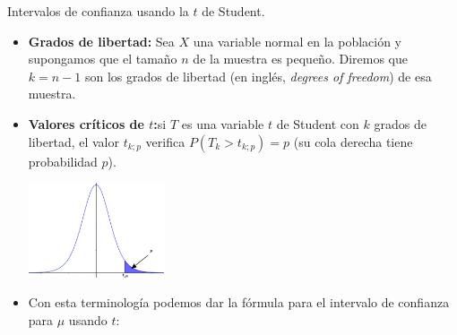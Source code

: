 \documentclass[
  9pt,
  ignorenonframetext,
]{beamer}
\begin{document}
\begin{frame}{Intervalos de confianza usando la \(t\) de Student.}
\protect\hypertarget{intervalos-de-confianza-usando-la-t-de-student.}{}

\begin{itemize}
\item
  \textbf{Grados de libertad:} Sea \(X\) una variable normal en la
  población y supongamos que el tamaño \(n\) de la muestra es pequeño.
  Diremos que \(k = n - 1\) son los grados de libertad (en inglés,
  \emph{degrees of freedom}) de esa muestra.
\item
  \textbf{Valores críticos de \(t\):}si \(T\) es una variable \(t\) de
  Student con \(k\) grados de libertad, el valor \(t_{k; p}\) verifica
  \(P(T_k > t_{k; p}) = p\) (su cola derecha tiene probabilidad \(p\)).

  \begin{center}\includegraphics[width=4cm]{../fig/06-05-ValorCriticoT} \end{center}
\item
  Con esta terminología podemos dar la fórmula para el intervalo de
  confianza para \(\mu\) usando \(t\):

  \begin{center}
  \end{center}
\end{itemize}

\end{frame}
\end{document}
